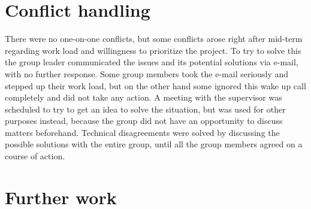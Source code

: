 \section{Conflict handling}
There were no one-on-one conflicts, but some conflicts arose right after mid-term regarding work load and willingness to prioritize the project. To try to solve this the group leader communicated the issues and its potential solutions via e-mail, with no further response. Some group members took the e-mail seriously and stepped up their work load, but on the other hand some ignored this wake up call completely and did not take any action. A meeting with the supervisor was scheduled to try to get an idea to solve the situation, but was used for other purposes instead, because the group did not have an opportunity to discuss matters beforehand.
Technical disagreements were solved by discussing the possible solutions with the entire group, until all the group members agreed on a course of action.

\section{Further work}
